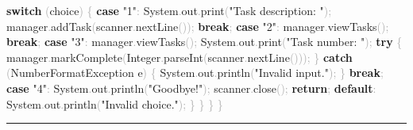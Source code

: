 \documentclass[
  justified,
  openright,
]{tufte-book}
\newcommand{\KeywordTok}[1]{\textcolor{CodeKeyword}{\textbf{#1}}}  %
\newcommand{\StringTok}[1]{\textcolor{CodeString}{#1}}              %
\newcommand{\CodeFuncTok}[1]{\textcolor{CodeKeyword}{#1}}           %
\newcommand{\OperatorTok}[1]{\textcolor{DarkGray}{#1}}              %
\newenvironment{Shaded}{%
  \begin{mdframed}[style=TufteCode]%
}{%
  \end{mdframed}%
}
\begin{document}
\begin{Shaded}
\begin{Highlighting}[]
            \KeywordTok{switch} \OperatorTok{(}choice\OperatorTok{)} \OperatorTok{\{}
                \KeywordTok{case} \StringTok{"1"}\OperatorTok{:}
                    System\OperatorTok{.}\CodeFuncTok{out}\OperatorTok{.}\CodeFuncTok{print}\OperatorTok{(}\StringTok{"Task description: "}\OperatorTok{);}
                    manager\OperatorTok{.}\CodeFuncTok{addTask}\OperatorTok{(}scanner\OperatorTok{.}\CodeFuncTok{nextLine}\OperatorTok{());}
                    \KeywordTok{break}\OperatorTok{;}
                \KeywordTok{case} \StringTok{"2"}\OperatorTok{:}
                    manager\OperatorTok{.}\CodeFuncTok{viewTasks}\OperatorTok{();}
                    \KeywordTok{break}\OperatorTok{;}
                \KeywordTok{case} \StringTok{"3"}\OperatorTok{:}
                    manager\OperatorTok{.}\CodeFuncTok{viewTasks}\OperatorTok{();}
                    System\OperatorTok{.}\CodeFuncTok{out}\OperatorTok{.}\CodeFuncTok{print}\OperatorTok{(}\StringTok{"Task number: "}\OperatorTok{);}
                    \KeywordTok{try} \OperatorTok{\{}
                        manager\OperatorTok{.}\CodeFuncTok{markComplete}\OperatorTok{(}Integer\OperatorTok{.}\CodeFuncTok{parseInt}\OperatorTok{(}scanner\OperatorTok{.}\CodeFuncTok{nextLine}\OperatorTok{()));}
                    \OperatorTok{\}} \KeywordTok{catch} \OperatorTok{(}NumberFormatException e\OperatorTok{)} \OperatorTok{\{}
                        System\OperatorTok{.}\CodeFuncTok{out}\OperatorTok{.}\CodeFuncTok{println}\OperatorTok{(}\StringTok{"Invalid input."}\OperatorTok{);}
                    \OperatorTok{\}}
                    \KeywordTok{break}\OperatorTok{;}
                \KeywordTok{case} \StringTok{"4"}\OperatorTok{:}
                    System\OperatorTok{.}\CodeFuncTok{out}\OperatorTok{.}\CodeFuncTok{println}\OperatorTok{(}\StringTok{"Goodbye!"}\OperatorTok{);}
                    scanner\OperatorTok{.}\CodeFuncTok{close}\OperatorTok{();}
                    \KeywordTok{return}\OperatorTok{;}
                \KeywordTok{default}\OperatorTok{:}
                    System\OperatorTok{.}\CodeFuncTok{out}\OperatorTok{.}\CodeFuncTok{println}\OperatorTok{(}\StringTok{"Invalid choice."}\OperatorTok{);}
            \OperatorTok{\}}
        \OperatorTok{\}}
    \OperatorTok{\}}
\OperatorTok{\}}
\end{Highlighting}
\end{Shaded}

\begin{center}\rule{0.5\linewidth}{0.5pt}\end{center}
\end{document}
